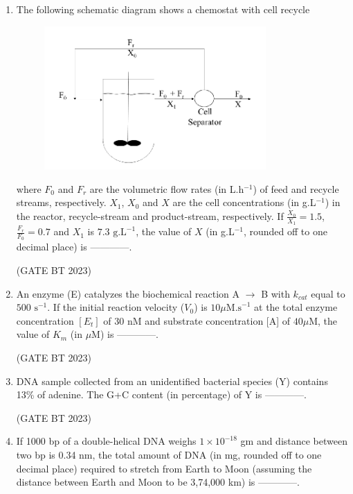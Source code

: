 \documentclass[journal,12pt,onecolumn]{IEEEtran}
\begin{document}
\begin{enumerate}
    \item The following schematic diagram shows a chemostat with cell recycle
    \begin{figure}[H]
        \centering
        \includegraphics[width=0.8\textwidth]{Fig 3.png}
        \caption{}
        \label{fig:question53}
    \end{figure}
    where $F_0$ and $F_r$ are the volumetric flow rates (in L.h$^{-1}$) of feed and recycle streams, respectively. $X_1$, $X_0$ and $X$ are the cell concentrations (in g.L$^{-1}$) in the reactor, recycle-stream and product-stream, respectively. If $\frac{X_0}{X_1} = 1.5$, $\frac{F_r}{F_0} = 0.7$ and $X_1$ is $7.3 \text{ g.L}^{-1}$, the value of $X$ (in g.L$^{-1}$, rounded off to one decimal place) is ------------.

    \hfill(GATE BT 2023)

    \item An enzyme (E) catalyzes the biochemical reaction A $\rightarrow$ B with $k_{cat}$ equal to $500 \text{ s}^{-1}$. If the initial reaction velocity ($V_0$) is $10 \mu\text{M.s}^{-1}$ at the total enzyme concentration $[E_t]$ of 30 nM and substrate concentration [A] of $40 \mu\text{M}$, the value of $K_m$ (in $\mu\text{M}$) is ------------.

    \hfill(GATE BT 2023)

    \item DNA sample collected from an unidentified bacterial species (Y) contains 13\% of adenine. The G+C content (in percentage) of Y is ------------.

    \hfill(GATE BT 2023)

    \item If 1000 bp of a double-helical DNA weighs $1 \times 10^{-18}$ gm and distance between two bp is 0.34 nm, the total amount of DNA (in mg, rounded off to one decimal place) required to stretch from Earth to Moon (assuming the distance between Earth and Moon to be 3,74,000 km) is ------------.


\end{enumerate}
\end{document}
